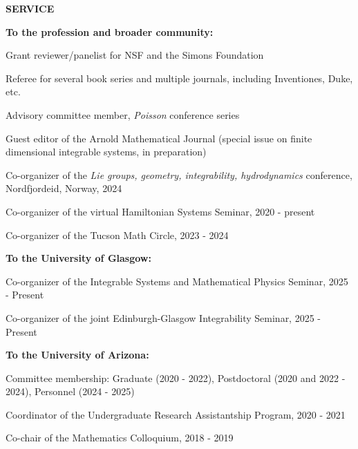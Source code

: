 \documentclass[a4paper, 12pt]{article}
\begin{document}
\textbf{SERVICE} \par\smallskip
\textbf{To the profession and broader community:}
\begin{compactitem}
\item Grant reviewer/panelist for NSF and the Simons Foundation
\item Referee for several book series and multiple journals, including Inventiones, Duke, etc.
\item Advisory committee member, \emph{Poisson} conference series
\item Guest editor of the Arnold Mathematical Journal (special issue on finite dimensional integrable systems, in preparation)
\item Co-organizer of the \emph{Lie groups, geometry, integrability, hydrodynamics} conference, Nordfjordeid, Norway, 2024
\item Co-organizer of the virtual Hamiltonian Systems Seminar, 2020 - present
\item Co-organizer of the Tucson Math Circle, 2023 - 2024
\end{compactitem}
 \par\smallskip
\textbf{To the University of Glasgow:}
\begin{compactitem}
\item Co-organizer of the Integrable Systems and Mathematical Physics Seminar, 2025 - Present
\item Co-organizer of the joint Edinburgh-Glasgow Integrability Seminar, 2025 - Present
\end{compactitem}
  \par\smallskip
\textbf{To the University of Arizona:}
\begin{compactitem}
\item Committee membership: Graduate (2020 - 2022),  Postdoctoral (2020 and 2022 - 2024), Personnel (2024 - 2025)
\item Coordinator of the Undergraduate Research Assistantship Program, 2020 - 2021
\item Co-chair of the {Mathematics Colloquium}, 2018 - 2019
\end{compactitem}
\end{document}
